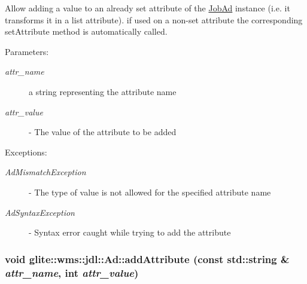 Allow adding a value to an already set attribute of the \hyperlink{classglite_1_1wms_1_1jdl_1_1JobAd}{Job\-Ad} instance (i.e. it transforms it in a list attribute). if used on a non-set attribute the corresponding set\-Attribute method is automatically called. \begin{Desc}
\item[Parameters:]
\begin{description}
\item[{\em attr\_\-name}]a string representing the attribute name \item[{\em attr\_\-value}]- The value of the attribute to be added \end{description}
\end{Desc}
\begin{Desc}
\item[Exceptions:]
\begin{description}
\item[{\em Ad\-Mismatch\-Exception}]- The type of value is not allowed for the specified attribute name \item[{\em Ad\-Syntax\-Exception}]- Syntax error caught while trying to add the attribute \end{description}
\end{Desc}
\hypertarget{classglite_1_1wms_1_1jdl_1_1Ad_z19_2}{
\subsubsection[addAttribute]{\setlength{\rightskip}{0pt plus 5cm}void glite::wms::jdl::Ad::add\-Attribute (const std::string \& {\em attr\_\-name}, int {\em attr\_\-value})}}
\label{classglite_1_1wms_1_1jdl_1_1Ad_z19_2}


